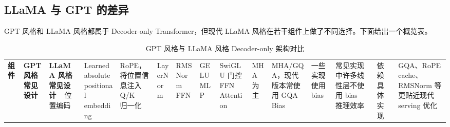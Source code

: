 \subsection{LLaMA 与 GPT 的差异}
\label{subsec:llama-vs-gpt}

GPT 风格和 LLaMA 风格都属于 Decoder-only Transformer，但现代 LLaMA 风格在若干组件上做了不同选择。下面给出一个概览表。

\begin{table}[H]
\centering
\small
\caption{GPT 风格与 LLaMA 风格 Decoder-only 架构对比}
\label{tab:gpt-vs-llama}
\begin{tabular}{p{}p{}p{}}
\toprule
\textbf{组件} & \textbf{GPT 风格常见设计} & \textbf{LLaMA 风格常见设计} \
\midrule
位置编码
& Learned absolute positional embedding
& RoPE，将位置信息注入 Q/K \
\midrule
归一化
& LayerNorm
& RMSNorm \
\midrule
FFN
& GELU MLP
& SwiGLU 门控 FFN \
\midrule
Attention
& MHA 为主
& MHA/GQA，现代版本常使用 GQA \
\midrule
Bias
& 一些实现使用 bias
& 常见实现中许多线性层不使用 bias \
\midrule
推理效率
& 依赖具体实现
& GQA、RoPE cache、RMSNorm 等更贴近现代 serving 优化 \
\bottomrule
\end{tabular}
\end{table}

